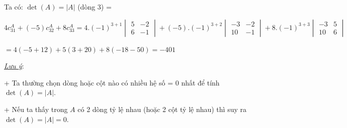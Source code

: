 \documentclass[
]{article}
\let\ul\uline
\begin{document}
Ta có: $\det(A) = |A|$ (dòng
3) =

$$4c_{31}^A + (-5)c_{32}^A + 8c_{33}^A = 4.(-1)^{3+1} \begin{vmatrix} 5 & -2 \\ 6 & -1 \end{vmatrix} + (-5).(-1)^{3+2} \begin{vmatrix} -3 & -2 \\ 10 & -1 \end{vmatrix} + 8.(-1)^{3+3} \begin{vmatrix} -3 & 5 \\ 10 & 6 \end{vmatrix}$$

$= 4(-5 + 12) + 5(3 + 20) + 8(-18 - 50) = -401$

\emph{\ul{Lưu ý}}:

+ Ta thường chọn dòng hoặc cột nào có nhiều hệ số = 0 nhất để tính
$\det(A) = |A|$.

+ Nếu ta thấy trong
$A$ có 2 dòng tỷ
lệ nhau (hoặc 2 cột tỷ lệ nhau) thì suy ra
$\det(A) = |A| = 0$.
\end{document}
